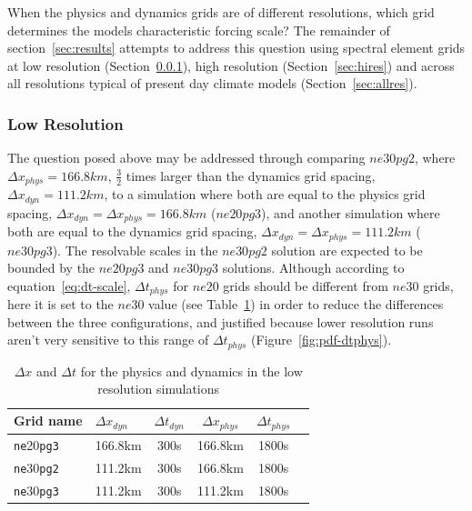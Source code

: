 \documentclass{agujournal}
\begin{document}
When the physics and dynamics grids are of different resolutions, which grid determines the models characteristic forcing scale? The remainder of section~\ref{sec:results} attempts to address this question using spectral element grids at low resolution (Section~\ref{sec:lores}), high resolution (Section~\ref{sec:hires}) and across all resolutions typical of present day climate models (Section~\ref{sec:allres}).

\subsubsection{Low Resolution}\label{sec:lores}

The question posed above may be addressed through comparing $ne30pg2$, where $\Delta x_{phys} = 166.8km$, $\frac{3}{2}$ times larger than the dynamics grid spacing, $\Delta x_{dyn} = 111.2km$, to a simulation where both are equal to the physics grid spacing, $\Delta x_{dyn} = \Delta x_{phys} = 166.8 km$ ($ne20pg3$), and another simulation where both are equal to the dynamics grid spacing, $\Delta x_{dyn} = \Delta x_{phys} = 111.2 km$ ($ne30pg3$). The resolvable scales in the $ne30pg2$ solution are expected to be bounded by the $ne20pg3$ and $ne30pg3$ solutions. Although according to equation~\ref{eq:dt-scale}, $\Delta t_{phys}$ for $ne20$ grids should be different from $ne30$ grids, here it is set to the $ne30$ value (see Table~\ref{table:grids-lo}) in order to reduce the differences between the three configurations, and justified because lower resolution runs aren't very sensitive to this range of $\Delta t_{phys}$ (Figure~\ref{fig:pdf-dtphys}).

 \begin{table}
 \caption{$\Delta x$ and $\Delta t$ for the physics and dynamics in the low resolution simulations}
 \centering
 \begin{tabular}{llcccc}
 \hline
 Grid name & $\Delta x_{dyn}$  & $\Delta t_{dyn}$ & $\Delta x_{phys}$  & $\Delta t_{phys}$ \\
 \hline
   {\tt{ne}}20{\tt{pg3}}  & 166.8km & 300s  & 166.8km & 1800s \\
   {\tt{ne}}30{\tt{pg2}}  & 111.2km & 300s  & 166.8km & 1800s \\
   {\tt{ne}}30{\tt{pg3}}  & 111.2km & 300s  & 111.2km & 1800s \\
 \hline
 \end{tabular}
 \label{table:grids-lo}
 \end{table}
\end{document}
